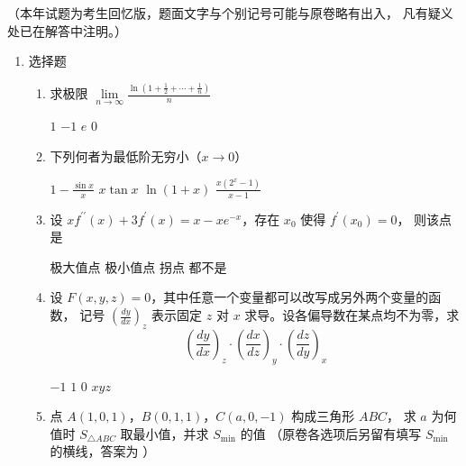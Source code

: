 
\noindent
{\kaishu\color{gray!50!black}
（本年试题为考生回忆版，题面文字与个别记号可能与原卷略有出入，
凡有疑义处已在解答中注明。）}

\vspace*{2ex}

\begin{enumerate}
	\item
选择题
\begin{enumerate}
	\item
求极限 $\lim\limits_{n \rightarrow \infty} \frac{\ln \left(1+\frac{1}{2}+\cdots+\frac{1}{n}\right)}{n}$ 

\fourchoices
{$1$}
{$-1$}
{$e$}
{$0$}


\item
下列何者为最低阶无穷小（$x \rightarrow 0$） 

\fourchoices
{$1-\frac{\sin x}{x}$}
{$x \tan x$}
{$\ln (1+x)$}
{$\frac{x\left(2^x-1\right)}{x-1}$}


\item
设 $x f^{\prime \prime}(x)+3 f^{\prime}(x)=x-x e^{-x}$，存在 $x_0$ 使得 $f^{\prime}\left(x_0\right)=0$，
则该点是 

\fourchoices
{极大值点}
{极小值点}
{拐点}
{都不是}


\item
设 $F(x, y, z)=0$，其中任意一个变量都可以改写成另外两个变量的函数，
记号 $\left(\frac{d y}{d x}\right)_z$ 表示固定 $z$ 对 $x$ 求导。设各偏导数在某点均不为零，求
\[
\left(\frac{d y}{d x}\right)_z \cdot\left(\frac{d x}{d z}\right)_y \cdot\left(\frac{d z}{d y}\right)_x
\]

\fourchoices
{$-1$}
{$1$}
{$0$}
{$x y z$}


\item
点 $A(1,0,1)$，$B(0,1,1)$，$C(a, 0,-1)$ 构成三角形 $ABC$，
求 $a$ 为何值时 $S_{\triangle A B C}$ 取最小值，并求 $S_{\min }$ 的值 
（原卷各选项后另留有填写 $S_{\min }$ 的横线，答案为 ）


\end{enumerate}
\end{enumerate}
